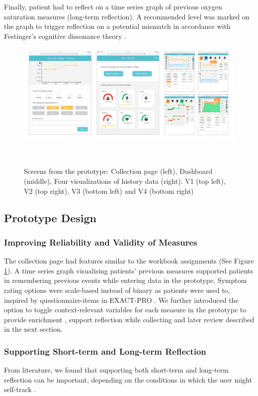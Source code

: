 Finally, patient had to reflect on a time series graph of previous oxygen saturation measures (long-term reflection). A recommended level was marked on the graph to trigger reflection on a potential mismatch in accordance with Festinger’s cognitive dissonance theory \cite{Rivera}.

\begin{figure}
 \centering
 \includegraphics[width=2.1\columnwidth]{img/screens}
 \caption{Screens from the prototype: Collection page (left), Dashboard (middle), Four visualizations of history data (right). V1 (top left), V2 (top right), V3 (bottom left) and V4 (bottom right)}~\label{fig:design}
\end{figure}

\subsection{Prototype Design}
\subsubsection{Improving Reliability and Validity of Measures}
The collection page had features similar to the workbook assignments (See Figure \ref{fig:design}). A time series graph visualising patients’ previous measures supported patients in remembering previous events while entering data in the prototype. Symptom rating options were scale-based instead of binary as patients were used to, inspired by questionnaire-items in EXACT-PRO \cite{exact}. We further introduced the option to toggle context-relevant variables for each measure in the prototype to provide enrichment \cite{Rivera}, support reflection while collecting and later review described in the next section.

\subsubsection{Supporting Short-term and Long-term Reflection}
From literature, we found that supporting both short-term and long-term reflection can be important, depending on the conditions in which the user might self-track \cite{Li2010, Muller}.

